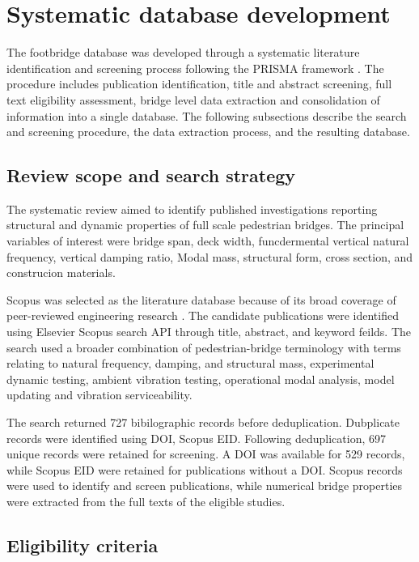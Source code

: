 \documentclass[preprint,a4paper,12pt]{elsarticle}
\begin{document}
\section{Systematic database development} 

The footbridge database was developed through a systematic literature identification and screening process following the PRISMA framework \cite{page2021prisma}.
The procedure includes publication identification, title and abstract screening, full text eligibility assessment, bridge level data extraction and consolidation of information into a single database.
The following subsections describe the search and screening procedure, the data extraction process, and the resulting database.

\subsection{Review scope and search strategy}

The systematic review aimed to identify published investigations reporting structural and dynamic properties of full scale pedestrian bridges.
The principal variables of interest were bridge span, deck width, funcdermental vertical natural frequency, vertical damping ratio, Modal mass, structural form, cross section, and construcion materials.

Scopus was selected as the literature database because of its broad coverage of peer-reviewed engineering research \cite{burnham2006scopus}.
The candidate publications were identified using Elsevier Scopus search API through title, abstract, and keyword feilds.
The search used a broader combination of pedestrian-bridge terminology with terms relating to natural frequency, damping, and structural mass, experimental dynamic testing, ambient vibration testing, operational modal analysis, model updating and vibration serviceability.

The search returned 727 bibilographic records before deduplication.
Dubplicate records were identified using DOI, Scopus EID.
Following deduplication, 697 unique records were retained for screening.
A DOI was available for 529 records, while Scopus EID were retained for publications without a DOI.
Scopus records were used to identify and screen publications, while numerical bridge properties were extracted from the full texts of the eligible studies.

\subsection{Eligibility criteria}
\end{document}
